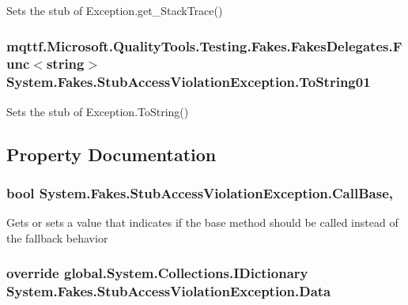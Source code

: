 Sets the stub of Exception.\-get\-\_\-\-Stack\-Trace()

\hypertarget{class_system_1_1_fakes_1_1_stub_access_violation_exception_ae445aa5bc45816a436b36c3eccbf094c}{
\subsubsection[{To\-String01}]{\setlength{\rightskip}{0pt plus 5cm}mqttf.\-Microsoft.\-Quality\-Tools.\-Testing.\-Fakes.\-Fakes\-Delegates.\-Func$<$string$>$ System.\-Fakes.\-Stub\-Access\-Violation\-Exception.\-To\-String01}}\label{class_system_1_1_fakes_1_1_stub_access_violation_exception_ae445aa5bc45816a436b36c3eccbf094c}


Sets the stub of Exception.\-To\-String()



\subsection{Property Documentation}
\hypertarget{class_system_1_1_fakes_1_1_stub_access_violation_exception_a6bc010fbed632d7fb5a244b6c5f25dab}{
\subsubsection[{Call\-Base}]{\setlength{\rightskip}{0pt plus 5cm}bool System.\-Fakes.\-Stub\-Access\-Violation\-Exception.\-Call\-Base\hspace{0.3cm}{\ttfamily [get]}, {\ttfamily [set]}}}\label{class_system_1_1_fakes_1_1_stub_access_violation_exception_a6bc010fbed632d7fb5a244b6c5f25dab}


Gets or sets a value that indicates if the base method should be called instead of the fallback behavior

\hypertarget{class_system_1_1_fakes_1_1_stub_access_violation_exception_a68221b9f9b8feeec51cc652fddcf2ba3}{
\subsubsection[{Data}]{\setlength{\rightskip}{0pt plus 5cm}override global.\-System.\-Collections.\-I\-Dictionary System.\-Fakes.\-Stub\-Access\-Violation\-Exception.\-Data\hspace{0.3cm}{\ttfamily [get]}}}\label{class_system_1_1_fakes_1_1_stub_access_violation_exception_a68221b9f9b8feeec51cc652fddcf2ba3}



